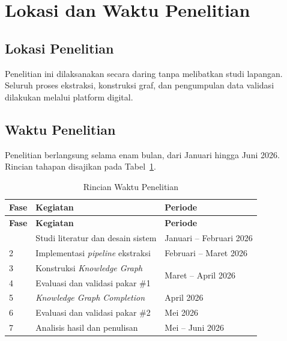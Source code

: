 \documentclass[main]{subfiles}
\begin{document}
\section{Lokasi dan Waktu Penelitian}

\subsection{Lokasi Penelitian}

Penelitian ini dilaksanakan secara daring tanpa melibatkan studi
lapangan. Seluruh proses ekstraksi, konstruksi graf, dan pengumpulan
data validasi dilakukan melalui platform digital.

\subsection{Waktu Penelitian}

Penelitian berlangsung selama enam bulan, dari Januari hingga Juni 2026.
Rincian tahapan disajikan pada Tabel~\ref{tab:waktu}.

\begin{longtable}{@{}lll@{}}
  \caption{Rincian Waktu Penelitian}
  \label{tab:waktu}\\
  \toprule
  \textbf{Fase} & \textbf{Kegiatan} & \textbf{Periode} \\
  \midrule
  \endfirsthead
  \toprule
  \textbf{Fase} & \textbf{Kegiatan} & \textbf{Periode} \\
  \midrule
  \endhead
  \midrule
  \endfoot
  \bottomrule
  \endlastfoot
  1 & Studi literatur dan desain sistem
    & Januari -- Februari 2026 \\
  2 & Implementasi \textit{pipeline} ekstraksi
    & Februari -- Maret 2026 \\
  3 & Konstruksi \textit{Knowledge Graph}
    & \multirow{2}{*}{Maret -- April 2026} \\
  4 & Evaluasi dan validasi pakar \#1 & \\
  5 & \textit{Knowledge Graph Completion}
    & April 2026 \\
  6 & Evaluasi dan validasi pakar \#2
    & Mei 2026 \\
  7 & Analisis hasil dan penulisan
    & Mei -- Juni 2026 \\
\end{longtable}

\end{document}
